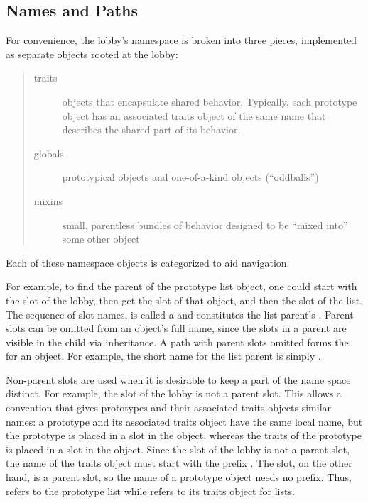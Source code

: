 \documentclass[letterpaper,10pt,english]{sphinxmanual}
\begin{document}
\subsection{Names and Paths}
\label{\detokenize{worldorg:names-and-paths}}
For convenience, the lobby’s namespace is broken into three pieces, implemented as separate objects
rooted at the lobby:
\begin{quote}
\begin{description}
\item[{traits}] \leavevmode
objects that encapsulate shared behavior. Typically, each prototype object has an associated traits object of the same name that describes the shared part of its behavior.

\item[{globals}] \leavevmode
prototypical objects and one-of-a-kind objects (“oddballs”)

\item[{mixins}] \leavevmode
small, parentless bundles of behavior designed to be “mixed into” some other object

\end{description}
\end{quote}

Each of these namespace objects is categorized to aid navigation.

For example, to find the parent of the prototype list object, one could start with the  slot
of the lobby, then get the  slot of that object, and then the  slot of the list. The sequence
of slot names,  is called a  and constitutes the list parent’s
. Parent slots can be omitted from an object’s full name, since the slots in a parent are visible
in the child via inheritance. A path with parent slots omitted forms the  for an object.
For example, the short name for the list parent is simply .

Non-parent slots are used when it is desirable to keep a part of the name space distinct. For example,
the  slot of the lobby is not a parent slot. This allows a convention that gives prototypes
and their associated traits objects similar names: a prototype and its associated traits object have
the same local name, but the prototype is placed in a slot in the  object, whereas the traits
of the prototype is placed in a slot in the  object. Since the  slot of the lobby is not
a parent slot, the name of the traits object must start with the prefix . The  slot,
on the other hand, is a parent slot, so the name of a prototype object needs no prefix. Thus, 
refers to the prototype list while  refers to its traits object for lists.
\end{document}
